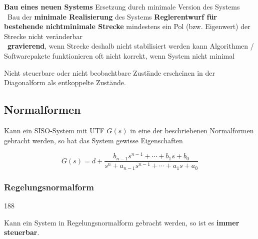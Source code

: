 \begin{outline}
    \1 \textbf{Bau eines neuen Systems}
        \2 Ersetzung durch minimale Version des Systems \\
        \textrightarrow\ Bau der \textbf{minimale Realisierung} des Systems
    \1 \textbf{Reglerentwurf für bestehende nichtminimale Strecke}
        \2 mindestens ein Pol (bzw. Eigenwert) der Strecke nicht veränderbar \\
            \textrightarrow\ \textbf{gravierend}, wenn Strecke deshalb nicht stabilisiert werden kann
        \2 Algorithmen / Softwarepakete funktionieren oft nicht korrekt, wenn System nicht minimal
\end{outline}

Nicht steuerbare oder nicht beobachtbare Zustände erscheinen in der Diagonalform als entkoppelte Zustände.
\subsection{Normalformen}

Kann ein SISO-System mit UTF $G(s)$ in eine der beschriebenen Normalformen gebracht werden, so hat das System gewisse Eigenschaften

$$  G(s) = d + \frac{b_{n-1} s^{n-1} + \cdots + b_1 s + b_0}{s^n + a_{n-1} s^{n-1} + \cdots + a_1 s +a_0 } $$


\subsubsection{Regelungsnormalform}{188}
\label{Regelungsnormalform}

Kann ein System in Regelungsnormalform gebracht werden, so ist es \textbf{immer steuerbar}.

